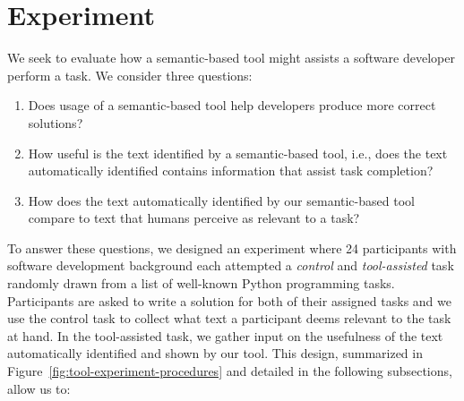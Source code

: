 




\section{Experiment}
\label{cp6:experiment}








We seek to evaluate how a semantic-based tool might assists a software developer perform a task.
We consider three questions:


\begin{enumerate}[label=RQ\arabic*]
    \item Does usage of a semantic-based tool help developers produce more correct solutions? 
    \item How useful is the text identified by a semantic-based tool, i.e., does the text automatically identified contains information that assist task completion? 
    \item How does the text automatically identified by our semantic-based tool compare to text 
    that humans perceive as relevant to a task?
\end{enumerate}


% 


To answer these questions, we designed an experiment where 24 participants with software development background each attempted a
\textit{control} and \textit{tool-assisted} task randomly drawn from a list of well-known Python programming tasks.
Participants are asked to write a solution for both of their assigned tasks
and we use the control task to collect what text a participant deems relevant to the task at hand.
In the tool-assisted task, we gather input on the usefulness of the text automatically identified and shown by our tool. 
This design, summarized in Figure~\ref{fig:tool-experiment-procedures} and detailed in the following subsections,  allow us to:






